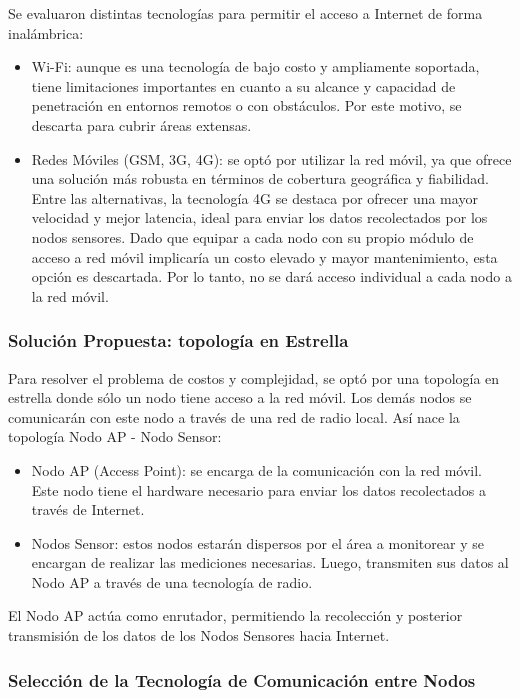Se evaluaron distintas tecnologías para permitir el acceso a Internet de forma inalámbrica:

\begin{itemize}
    \item Wi-Fi: aunque es una tecnología de bajo costo y ampliamente soportada, tiene limitaciones importantes en cuanto a su alcance y capacidad de penetración en entornos remotos o con obstáculos. Por este motivo, se descarta para cubrir áreas extensas.
    \item Redes Móviles (GSM, 3G, 4G): se optó por utilizar la red móvil, ya que ofrece una solución más robusta en términos de cobertura geográfica y fiabilidad. Entre las alternativas, la tecnología 4G se destaca por ofrecer una mayor velocidad y mejor latencia, ideal para enviar los datos recolectados por los nodos sensores. 
    Dado que equipar a cada nodo con su propio módulo de acceso a red móvil implicaría un costo elevado y mayor mantenimiento, esta opción es descartada. Por lo tanto, no se dará acceso individual a cada nodo a la red móvil.
\end{itemize}



\subsubsection{Solución Propuesta: topología en Estrella}

Para resolver el problema de costos y complejidad, se optó por una topología en estrella donde sólo un nodo tiene acceso a la red móvil. Los demás nodos se comunicarán con este nodo a través de una red de radio local. Así nace la topología Nodo AP - Nodo Sensor:

\begin{itemize}
    \item Nodo AP (Access Point): se encarga de la comunicación con la red móvil. Este nodo tiene el hardware necesario para enviar los datos recolectados a través de Internet.
    \item Nodos Sensor: estos nodos estarán dispersos por el área a monitorear y se encargan de realizar las mediciones necesarias. Luego, transmiten sus datos al Nodo AP a través de una tecnología de radio.
\end{itemize}

El Nodo AP actúa como enrutador, permitiendo la recolección y posterior transmisión de los datos de los Nodos Sensores hacia Internet.

\subsubsection{Selección de la Tecnología de Comunicación entre Nodos}

